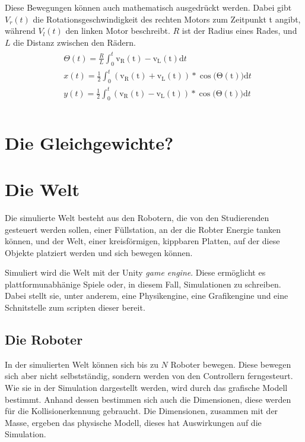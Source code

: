 \documentclass[
    12pt,
    bibliography=totoc,
    ngerman,
    enabledeprecatedfontcommands
]{scrartcl}
\begin{document}
Diese Bewegungen k{\"{o}}nnen auch mathematisch ausgedr{\"{u}}ckt werden. Dabei gibt $V_r(t)$ die Rotationsgeschwindigkeit des rechten Motors zum Zeitpunkt t angibt, w{\"{a}}hrend $V_l(t)$ den
linken Motor beschreibt. $R$ ist der Radius eines Rades, und $L$ die Distanz zwischen den R{\"{a}}dern.
\begin{multline}
\label{eq:diffs}
\begin{split}
	& \Theta(t) = \frac{R}{L} \int_0^t \mathrm{v_R(t) - v_L(t)}\mathrm{d}t \\
	& x(t) = \frac{1}{2} \int_0^t \mathrm{(v_R(t) + v_L(t)) * \cos\big(\Theta(t)\big)}\mathrm{d}t \\
	& y(t) = \frac{1}{2} \int_0^t \mathrm{(v_R(t) - v_L(t)) * \cos\big(\Theta(t)\big)}\mathrm{d}t \\
\end{split}
\end{multline}

\clearpage
\section{Die Gleichgewichte?}

\clearpage
\section{Die Welt}
Die simulierte Welt besteht aus den Robotern, die von den Studierenden gesteuert werden sollen, einer F{\"{u}}llstation, an der die Robter Energie tanken k{\"{o}}nnen, und
der Welt, einer kreisf{\"{o}}rmigen, kippbaren Platten, auf der diese Objekte platziert werden und sich bewegen k{\"{o}}nnen.

Simuliert wird die Welt mit der Unity \textit{game engine}. Diese erm{\"{o}}glicht es plattformunabh{\"{a}}nige Spiele oder, in diesem Fall, Simulationen zu schreiben.
Dabei stellt sie, unter anderem, eine Physikengine, eine Grafikengine und eine Schnitstelle zum scripten dieser bereit. 

\subsection{Die Roboter}\label{robot}
In der simulierten Welt k{\"{o}}nnen sich bis zu $N$ Roboter bewegen. Diese bewegen sich aber nicht selbstst{\"{a}}ndig, sondern werden von den Controllern ferngesteurt.
Wie sie in der Simulation dargestellt werden, wird durch das grafische Modell bestimmt. Anhand dessen bestimmen sich auch die Dimensionen, diese werden f{\"{u}}r die Kollisionerkennung
gebraucht. Die Dimensionen, zusammen mit der Masse, ergeben das physische Modell, dieses hat Auswirkungen auf die Simulation.
\end{document}
